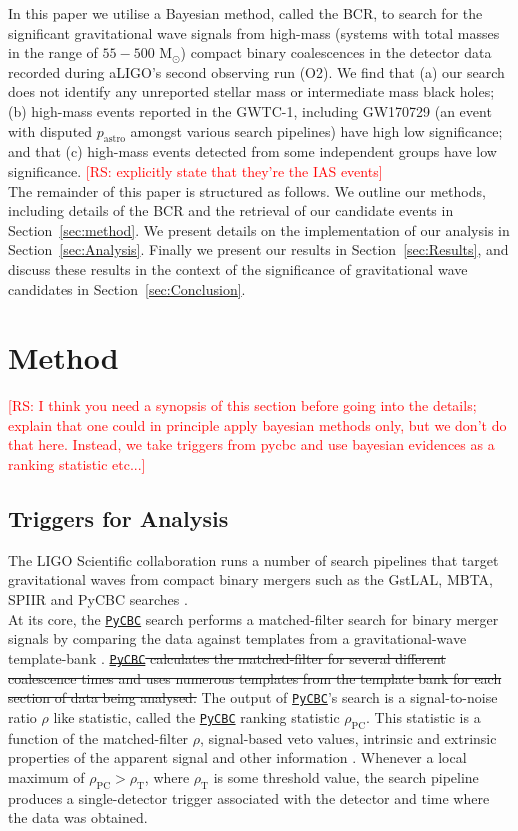 \documentclass[%
preprint,
 amsmath,amssymb,
 aps,
]{revtex4}
\newcommand{\pycbc}{{\sc \href{https://pycbc.org/}{\texttt{PyCBC}}}\xspace}
\newcommand{\bcr}{{\sc BCR}\xspace}
\newcommand{\msun}{{\sc M${}_\odot$}\xspace}
\newcommand{\rs}[1]{\textcolor{red}{[RS: #1]}}
\begin{document}
In this paper we utilise a Bayesian method, called the \bcr \cite{BCR1}, to search for the significant gravitational wave signals from high-mass (systems with total masses in the range of $55-500$ \msun) compact binary coalescences in the detector data recorded during aLIGO's second observing run (O2).  We find that (a) our search does not identify any unreported stellar mass or intermediate mass black holes; (b) high-mass events reported in the GWTC-1, including GW170729 (an event with disputed $p_\text{astro}$ amongst various search pipelines) have high low significance; and that (c) high-mass events detected from some independent groups have low significance. \rs{explicitly state that they're the IAS events}\\

The remainder of this paper is structured as follows. We outline our methods, including details of the \bcr and the retrieval of our candidate events in Section~\ref{sec:method}. We present details on the implementation of our analysis in Section~\ref{sec:Analysis}. Finally we present our results in Section~\ref{sec:Results}, and discuss these results in the context of the significance of gravitational wave candidates in Section~\ref{sec:Conclusion}.


\section{Method\label{sec:method}}
\rs{I think you need a synopsis of this section before going into the details; explain that one could in principle apply bayesian methods only, but we don't do that here. Instead, we take triggers from pycbc and use bayesian evidences as a ranking statistic etc...} 
\subsection{Triggers for Analysis}
The LIGO Scientific collaboration runs a number of search pipelines that target gravitational waves from compact binary mergers such as the GstLAL, MBTA, SPIIR and PyCBC searches \cite{abbott2019gwtc}.\\

At its core, the \pycbc \cite{pycbc_code} search performs a matched-filter search for binary merger signals by comparing the data against templates from a gravitational-wave template-bank \cite{pycbc_og6}. \sout{\pycbc calculates the matched-filter for several different coalescence times and uses numerous templates from the template bank for each section of data being analysed.} The output of \pycbc's search is a signal-to-noise ratio $\rho$ like statistic, called the \pycbc ranking statistic $\rho_\text{PC}$. This statistic is a function of the matched-filter $\rho$, signal-based veto values, intrinsic and extrinsic properties of the apparent signal and other information \cite{pycbc_og6}. Whenever a local maximum of $\rho_\text{PC} > \rho_\text{T}$, where $\rho_\text{T}$ is some threshold value, the search pipeline produces a single-detector trigger associated with the detector and time where the data was obtained.\\
\end{document}
